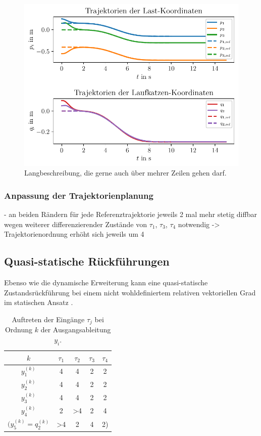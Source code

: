\begin{figure}[ht]
	\begin{center}
		\includegraphics[scale=1]{Pictures/dyn_controller_initial_error}
	\end{center}
	\caption[Kurzbeschreibung für Abbildungsverzeichnis]
	{Langbeschreibung, die gerne auch über mehrer Zeilen gehen darf.}
	\label{fig_dyn_controller_initial_error}
\end{figure}


\subsubsection{Anpassung der Trajektorienplanung}
- an beiden Rändern für jede Referenztrajektorie jeweils 2 mal mehr stetig diffbar wegen weiterer differenzierender Zustände von $\tau_1$, $\tau_3$, $\tau_4$ notwendig -> Trajektorienordnung erhöht sich jeweils um 4

\subsection{Quasi-statische Rückführungen}
Ebenso wie die dynamische Erweiterung kann eine quasi-statische Zustandsrückführung bei einem nicht wohldefiniertem relativen vektoriellen Grad im statischen Ansatz \cite[S. 206]{NLRT_Roebenack}.

\begin{table}[htbp]%
	\centering
	\caption{Auftreten der Eingänge $\tau_j$ bei Ordnung $k$ der Ausgangsableitung $y_i$.}
	\label{tab:relative_degrees}
	\begin{tabular}{ c| c c c c } 
		$k$ & $\tau_1$ & $\tau_2$ & $\tau_3$ & $\tau_4$ \\ 
		\hline
		$y_1^{(k)}$ & 4 & 4 & 2 & 2\\ 
		$y_2^{(k)}$ & 4 & 4 & 2 & 2\\
		$y_3^{(k)}$ & 4 & 4 & 2 & 2\\		
		$y_4^{(k)}$ & 2 & >4 & 2 & 4\\
		$(y_5^{(k)} = q_2^{(k)}$ & >4 & 2 & 4 & 2)\\
		\bottomrule
	\end{tabular}
\end{table}

